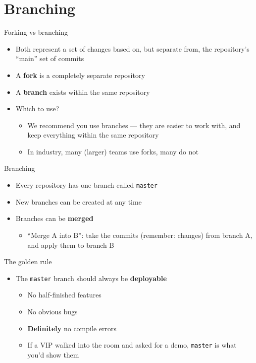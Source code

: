 \part{Branching}
\frame{\partpage}

\begin{frame}{Forking vs branching}
    \begin{itemize}
        \item Both represent a set of changes based on, but separate from, the repository's ``main'' set of commits
        \item A \textbf{fork} is a completely separate repository
        \item A \textbf{branch} exists within the same repository
        \item Which to use?
            \begin{itemize}
                \item We recommend you use branches ---
                    they are easier to work with, and keep everything within the same repository
                \item In industry, many (larger) teams use forks, many do not
            \end{itemize}
    \end{itemize}
\end{frame}

\begin{frame}{Branching}
    \begin{itemize}
        \item Every repository has one branch called \texttt{master}
        \item New branches can be created at any time
        \item Branches can be \textbf{merged}
            \begin{itemize}
                \item ``Merge A into B'':
                    take the commits (remember: changes) from branch A, and apply them to branch B
            \end{itemize}
    \end{itemize}
\end{frame}

\begin{frame}{The golden rule}
    \begin{itemize}
        \item The \texttt{master} branch should always be \textbf{deployable}
            \begin{itemize}
                \item No half-finished features
                \item No obvious bugs
                \item \textbf{Definitely} no compile errors
                \item If a VIP walked into the room and asked for a demo, \texttt{master} is what you'd show them
            \end{itemize}
    \end{itemize}
\end{frame}

